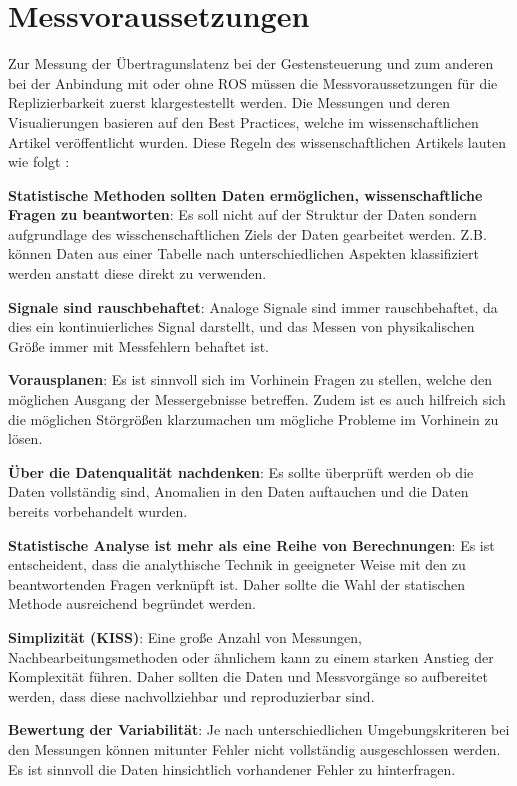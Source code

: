 \section{Messvoraussetzungen}
Zur Messung der Übertragunslatenz bei der Gestensteuerung und zum anderen bei der Anbindung mit oder ohne ROS müssen die Messvoraussetzungen für die Replizierbarkeit zuerst klargestestellt werden. Die Messungen und deren Visualierungen basieren auf den Best Practices, welche im wissenschaftlichen Artikel  veröffentlicht wurden. Diese Regeln des wissenschaftlichen Artikels lauten wie folgt \cite{kass_ten_2016}:
\begin{compactenumerate}
    \item \textbf{Statistische Methoden sollten Daten ermöglichen, wissenschaftliche Fragen zu beantworten}: Es soll nicht auf der Struktur der Daten sondern aufgrundlage des wisschenschaftlichen Ziels der Daten gearbeitet werden. Z.B. können Daten aus einer Tabelle nach unterschiedlichen Aspekten klassifiziert werden anstatt diese direkt zu verwenden.
    \item \textbf{Signale sind rauschbehaftet}: Analoge Signale sind immer rauschbehaftet, da dies ein kontinuierliches Signal darstellt, und das Messen von physikalischen Größe immer mit Messfehlern behaftet ist.
    \item \textbf{Vorausplanen}: Es ist sinnvoll sich im Vorhinein Fragen zu stellen, welche den möglichen Ausgang der Messergebnisse betreffen. Zudem ist es auch hilfreich sich die möglichen Störgrößen klarzumachen um mögliche Probleme im Vorhinein zu lösen.
    \item \textbf{Über die Datenqualität nachdenken}: Es sollte überprüft werden ob die Daten vollständig sind, Anomalien in den Daten auftauchen und die Daten bereits vorbehandelt wurden.
    \item \textbf{Statistische Analyse ist mehr als eine Reihe von Berechnungen}: Es ist entscheident, dass die analythische Technik in geeigneter Weise mit den zu beantwortenden Fragen verknüpft ist. Daher sollte die Wahl der statischen Methode ausreichend begründet werden.
    \item \textbf{Simplizität (KISS)}: Eine große Anzahl von Messungen, Nachbearbeitungsmethoden oder ähnlichem kann zu einem starken Anstieg der Komplexität führen. Daher sollten die Daten und Messvorgänge so aufbereitet werden, dass diese nachvollziehbar und reproduzierbar sind.
    \item \textbf{Bewertung der Variabilität}: Je nach unterschiedlichen Umgebungskriteren bei den Messungen können mitunter Fehler nicht vollständig ausgeschlossen werden. Es ist sinnvoll die Daten hinsichtlich vorhandener Fehler zu hinterfragen.

\end{compactenumerate}
